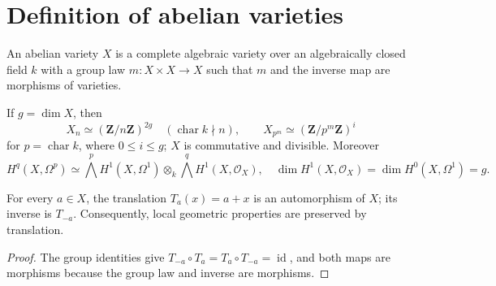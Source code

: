 
\section{Definition of abelian varieties}
\label{mumford-source-II4}

\begin{definition}
\label{mumford-def-abelian-variety}
An abelian variety $X$ is a complete algebraic variety over an algebraically
closed field $k$ with a group law $m:X\times X\to X$ such that $m$ and the
inverse map are morphisms of varieties.
\end{definition}

\begin{proposition}
\label{mumford-source-basic-structure}
If $g=\dim X$, then
\[
 X_n\simeq(\mathbf Z/n\mathbf Z)^{2g}\quad(\operatorname{char}k\nmid n),
 \qquad X_{p^m}\simeq(\mathbf Z/p^m\mathbf Z)^i
\]
for $p=\operatorname{char}k$, where $0\le i\le g$; $X$ is commutative and
divisible. Moreover
\[
 H^q(X,\Omega^p)\simeq\bigwedge^p H^1(X,\Omega^1)\otimes_k
 \bigwedge^q H^1(X,\mathcal O_X),
\quad \dim H^1(X,\mathcal O_X)=\dim H^0(X,\Omega^1)=g.
\]
\end{proposition}

\begin{lemma}[Translations]
\label{mumford-lem-abelian-translations}
For every $a\in X$, the translation $T_a(x)=a+x$ is an automorphism of $X$;
its inverse is $T_{-a}$.  Consequently, local geometric properties are
preserved by translation.
\end{lemma}
\begin{proof}
The group identities give $T_{-a}\circ T_a=T_a\circ T_{-a}=\operatorname{id}$,
and both maps are morphisms because the group law and inverse are morphisms.
\end{proof}

